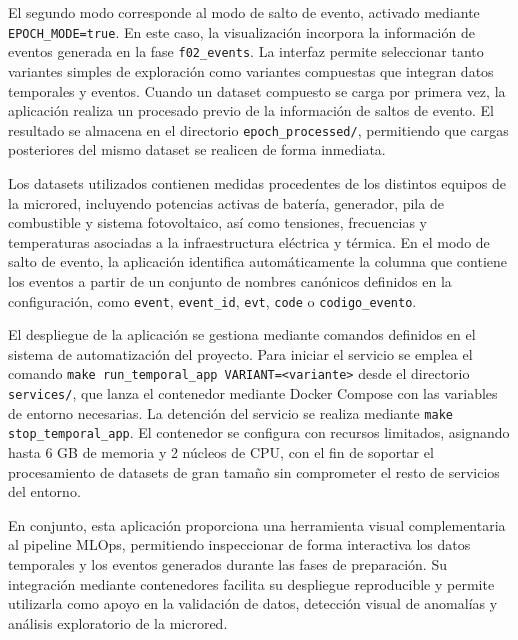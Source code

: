 El segundo modo corresponde al modo de salto de evento, activado mediante \texttt{EPOCH\_MODE=true}. En este caso, la visualización incorpora la información de eventos generada en la fase \texttt{f02\_events}. La interfaz permite seleccionar tanto variantes simples de exploración como variantes compuestas que integran datos temporales y eventos. Cuando un dataset compuesto se carga por primera vez, la aplicación realiza un procesado previo de la información de saltos de evento. El resultado se almacena en el directorio \texttt{epoch\_processed/}, permitiendo que cargas posteriores del mismo dataset se realicen de forma inmediata.

Los datasets utilizados contienen medidas procedentes de los distintos equipos de la microred, incluyendo potencias activas de batería, generador, pila de combustible y sistema fotovoltaico, así como tensiones, frecuencias y temperaturas asociadas a la infraestructura eléctrica y térmica. En el modo de salto de evento, la aplicación identifica automáticamente la columna que contiene los eventos a partir de un conjunto de nombres canónicos definidos en la configuración, como \texttt{event}, \texttt{event\_id}, \texttt{evt}, \texttt{code} o \texttt{codigo\_evento}.

El despliegue de la aplicación se gestiona mediante comandos definidos en el sistema de automatización del proyecto. Para iniciar el servicio se emplea el comando \texttt{make run\_temporal\_app VARIANT=<variante>} desde el directorio \texttt{services/}, que lanza el contenedor mediante Docker Compose con las variables de entorno necesarias. La detención del servicio se realiza mediante \texttt{make stop\_temporal\_app}. El contenedor se configura con recursos limitados, asignando hasta 6 GB de memoria y 2 núcleos de CPU, con el fin de soportar el procesamiento de datasets de gran tamaño sin comprometer el resto de servicios del entorno.

En conjunto, esta aplicación proporciona una herramienta visual complementaria al pipeline MLOps, permitiendo inspeccionar de forma interactiva los datos temporales y los eventos generados durante las fases de preparación. Su integración mediante contenedores facilita su despliegue reproducible y permite utilizarla como apoyo en la validación de datos, detección visual de anomalías y análisis exploratorio de la microred.


